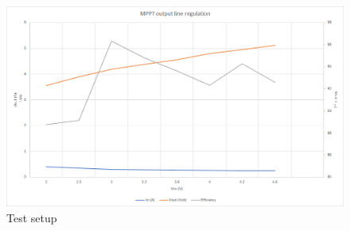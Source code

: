 \begin{figure}[h]
	\centering
	\includegraphics[width=\columnwidth]{IMGS/MPPT output line regulation at half load (200mA).png}
	\caption{Test setup}
	\label{fig:arch}
\end{figure}









